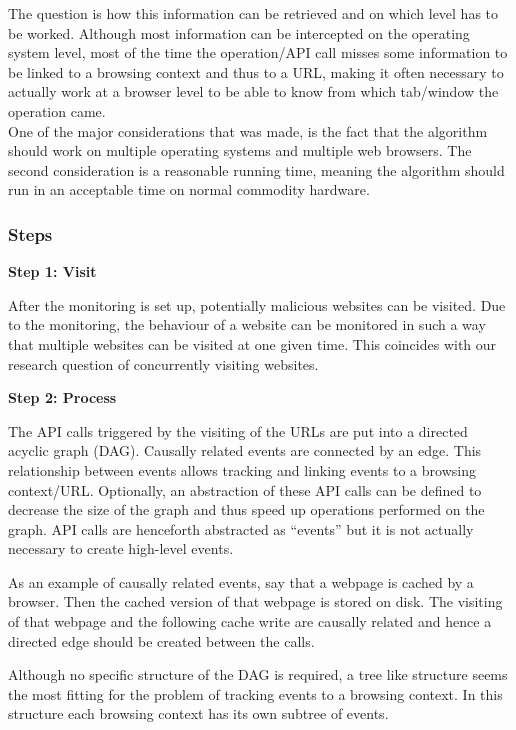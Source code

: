 The question is how this information can be retrieved and on which level has to be worked. Although most information can be intercepted on the operating system level, most of the time the operation/API call misses some information to be linked to a browsing context and thus to a URL, making it often necessary to actually work at a browser level to be able to know from which tab/window the operation came.\\%

One of the major considerations that was made, is the fact that the algorithm should work on multiple operating systems and multiple web browsers. The second consideration is a reasonable running time, meaning the algorithm should run in an acceptable time on normal commodity hardware.

\subsubsection{Steps}

\textbf{Step 1: Visit}

After the monitoring is set up, potentially malicious websites can be visited. Due to the monitoring, the behaviour of a website can be monitored in such a way that multiple websites can be visited at one given time. This coincides with our research question of concurrently visiting websites.


\textbf{Step 2: Process}
\label{sec:algos2}

The API calls triggered by the visiting of the URLs are put into a directed acyclic graph (DAG). Causally related events are connected by an edge. This relationship between events allows tracking and linking events to a browsing context/URL. Optionally, an abstraction of these API calls can be defined to decrease the size of the graph and thus speed up operations performed on the graph. API calls are henceforth abstracted as ``events'' but it is not actually necessary to create high-level events.

As an example of causally related events, say that a webpage is cached by a browser. Then the cached version of that webpage is stored on disk. The visiting of that webpage and the following cache write are causally related and hence a directed edge should be created between the calls.

Although no specific structure of the DAG is required, a tree like structure seems the most fitting for the problem of tracking events to a browsing context. In this structure each browsing context has its own subtree of events. 


